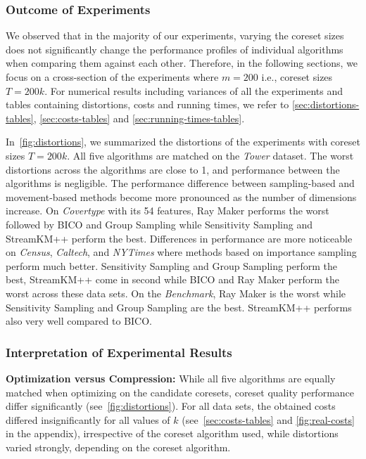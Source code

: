 






\subsubsection*{Outcome of Experiments}
We observed that in the majority of our experiments, varying the coreset sizes does not significantly change the performance profiles of individual algorithms when comparing them against each other. Therefore, in the following sections, we focus on a cross-section of the experiments where $m=200$ i.e., coreset sizes $T=200k$.
For numerical results including variances of all the experiments and tables containing distortions, costs and running times, we refer to \cref{sec:distortions-tables}, \cref{sec:costs-tables} and \cref{sec:running-times-tables}. 

In~\cref{fig:distortions}, we summarized the distortions of the experiments with coreset sizes $T=200k$. All five algorithms are matched on the \textit{Tower} dataset. The worst distortions across the algorithms are close to 1, and performance between the algorithms is negligible. The performance difference between sampling-based and movement-based methods become more pronounced as the number of dimensions increase. On \textit{Covertype} with its 54 features, Ray Maker performs the worst followed by BICO and Group Sampling while Sensitivity Sampling and StreamKM++ perform the best. Differences in performance are more noticeable on \textit{Census}, \textit{Caltech}, and \textit{NYTimes}  where methods based on importance sampling perform much better. Sensitivity Sampling and Group Sampling perform the best, StreamKM++ come in second while BICO and Ray Maker perform the worst across these data sets.
On the \textit{Benchmark}, Ray Maker is the worst while Sensitivity Sampling and Group Sampling are the best. StreamKM++ performs also very well compared to BICO.


\subsubsection*{Interpretation of Experimental Results}



{\bf Optimization versus Compression:}
While all five algorithms are equally matched when optimizing on the candidate coresets, coreset quality performance differ significantly (see~\cref{fig:distortions}). 
For all data sets, the obtained costs differed insignificantly for all values of $k$ (see~\cref{sec:costs-tables} and \cref{fig:real-costs} in the appendix), irrespective of the coreset algorithm used, while distortions varied strongly, depending on the coreset algorithm.

